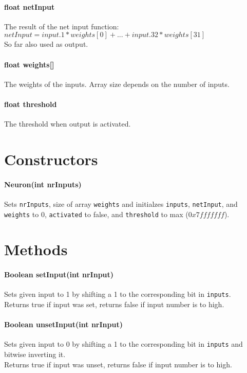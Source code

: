 \paragraph{float netInput}
The result of the net input function:\\
$netInput = input.1*weights[0] + ... + input.32*weights[31]$\\
So far also used as output.

\paragraph{float weights[]}
The weights of the inputs. Array size depends on the number of inputs.

\paragraph{float threshold}
The threshold when output is activated.


\section{Constructors}
\paragraph{Neuron(int nrInputs)}
Sets \texttt{nrInputs}, size of array \texttt{weights} and initialzes \texttt{inputs}, \texttt{netInput}, and \texttt{weights} to 0, \texttt{activated} to false, and \texttt{threshold} to max ($0x7fffffff$).

\section{Methods}
\paragraph{Boolean setInput(int nrInput)}
Sets given input to 1 by shifting a 1 to the corresponding bit in \texttt{inputs}.\\
Returns true if input was set, returns false if input number is to high.

\paragraph{Boolean unsetInput(int nrInput)}
Sets given input to 0 by shifting a 1 to the corresponding bit in \texttt{inputs} and bitwise inverting it.\\
Returns true if input was unset, returns false if input number is to high.

